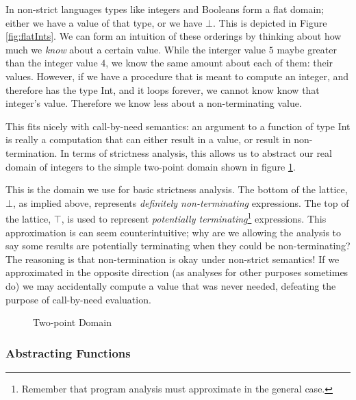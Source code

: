 In non-strict languages types like integers and Booleans form a flat domain;
either we have a value of that type, or we have $\bot$. This is depicted in
Figure \ref{fig:flatInts}. We can form an intuition of these orderings by
thinking about how much we \emph{know} about a certain value. While the
interger value $5$ maybe greater than the integer value $4$, we know the
same amount about each of them: their values. However, if we have a procedure
that is meant to compute an integer, and therefore has the type \<Int\>, and it
loops forever, we cannot know know that integer's value. Therefore we know less
about a non-terminating value.


This fits nicely with call-by-need semantics: an argument to a function of
type \<Int\> is really a computation that can either result in a value, or
result in non-termination. In terms of strictness analysis, this allows us to
abstract our real domain of integers to the simple two-point domain shown in
figure \ref{fig:twoPointNice}.

This is the domain we use for basic strictness analysis. The bottom of the
lattice, $\bot$, as implied above, represents \emph{definitely non-terminating}
expressions. The top of the lattice, $\top$, is used to represent
\emph{potentially terminating}\footnote{Remember that program analysis must
approximate in the general case.} expressions. This approximation is can seem
counterintuitive; why are we allowing the analysis to say some results are
potentially terminating when they could be non-terminating? The reasoning is
that non-termination is okay under non-strict semantics! If we approximated in
the opposite direction (as analyses for other purposes sometimes do) we may
accidentally compute a value that was never needed, defeating the purpose of
call-by-need evaluation.


\begin{figure}[hb]
\centering
{}
\caption{Two-point Domain}
\label{fig:twoPointNice}
\end{figure}

\subsubsection{Abstracting Functions}

